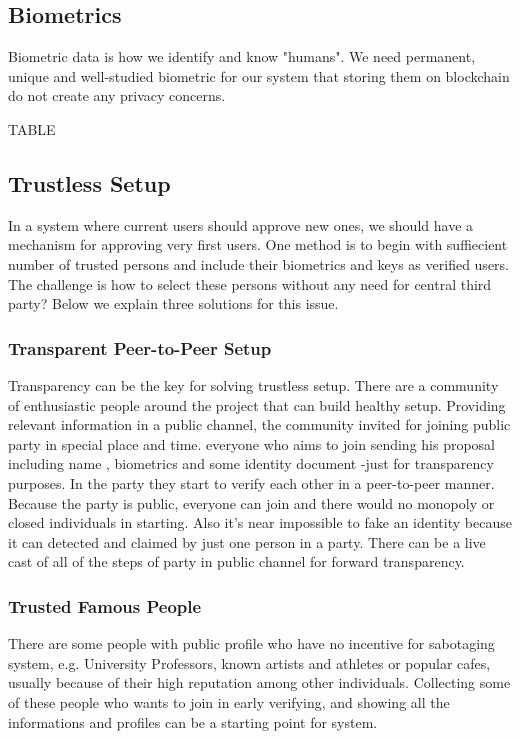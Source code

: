 \documentclass{article}
\begin{document}
\subsection{Biometrics}
Biometric data is how we identify and know "humans". We need permanent, unique and well-studied biometric for our system that storing them on blockchain do not create any privacy concerns. 

TABLE


\subsection{Trustless Setup}
In a system where current users should approve new ones, we should have a mechanism for approving very first users. One method is to begin with suffiecient number of trusted persons and include their biometrics and keys as verified users. The challenge is how to select these persons without any need for central third party? Below we explain three solutions for this issue.

\subsubsection*{Transparent Peer-to-Peer Setup} 
Transparency can be the key for solving trustless setup. There are a community of enthusiastic people around the project that can build healthy setup. Providing relevant information in a public channel, the community invited for joining public party in special place and time. everyone who aims to join sending his proposal including name , biometrics and some identity document -just for transparency purposes. In the party they start to verify each other in a peer-to-peer manner. Because the party is public, everyone can join and there would no monopoly or closed individuals in starting. Also it's near impossible to fake an identity because it can detected and claimed by just one person in a party. There can be a live cast of all of the steps of party in public channel for forward transparency.

\subsubsection*{Trusted Famous People}
There are some people with public profile who have no incentive for sabotaging system, e.g. University Professors, known artists and athletes or popular cafes, usually because of their high reputation among other individuals. Collecting some of these people who wants to join in early verifying, and showing all the informations and profiles can be a starting point for system.
\end{document}
